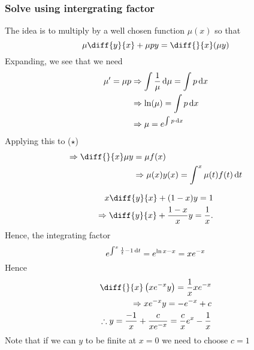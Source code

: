 \documentclass{article}
\begin{document}
\subsubsection*{Solve using intergrating factor}
The idea is to multiply by a well chosen function $\mu(x)$ so that
\[
    \mu \diff{y}{x} + \mu p y = \diff{}{x}(\mu y)
\]
Expanding, we see that we need
\begin{align*}
    \mu' = \mu p &\Rightarrow \int{\frac{1}{\mu} \mathop{}\!\mathrm{d}\mu} = \int{p \mathop{}\!\mathrm{d}x} \\
    &\Rightarrow \ln(\mu) = \int{p \mathop{}\!\mathrm{d}x} \\
    &\Rightarrow \mu = e^{\int{p \mathop{}\!\mathrm{d}x}}
\end{align*}
Applying this to ($\star$)
\begin{align*}
    \Rightarrow \diff{}{x} \mu y &= \mu f(x) \\
    &\Rightarrow \mu(x)y(x) = \int^{x}{\mu(t) f(t) \diffd t}
\end{align*}
\begin{eg}
    \begin{align}
        x \diff{y}{x} + (1 - x)y = 1 \\
        \Rightarrow \diff{y}{x} + \frac{1-x}{x} y = \frac{1}{x}.
    \end{align}
    Hence, the integrating factor 
    \[
        e^{\int^{x}{\frac{1}{t} - 1 \mathop{}\!\mathrm{d} t}} = e^{\ln x - x} = xe^{-x}
    \]
    Hence
    \begin{align*}
        \diff{}{x}\bkt{x e^{-x} y} = \frac{1}{x} x e^{-x} \\
        \Rightarrow x e^{-x} y = - e^{-x} + c \\
        \therefore y = \frac{-1}{x} + \frac{c}{x e^{-x}} = \frac{c}{x} e^{x} - \frac{1}{x}
    \end{align*}
    Note that if we can $y$ to be finite at $x = 0$ we need to choose $c = 1$
\end{eg}
\end{document}
